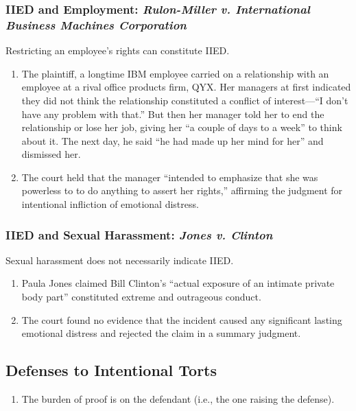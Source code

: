 \subsubsection{IIED and Employment: \emph{Rulon-Miller v. International Business Machines 
    Corporation}}

Restricting an employee's rights can constitute IIED.

\begin{enumerate}
    \item The plaintiff, a longtime IBM employee carried on a relationship 
    with an employee at a rival office products firm, QYX. Her managers at 
    first indicated they did not think the relationship constituted a conflict 
    of interest---``I don't have any problem with that.'' But then her manager 
    told her to end the relationship or lose her job, giving her ``a couple of 
    days to a week'' to think about it. The next day, he said ``he had made up 
    her mind for her'' and dismissed her.
    \item The court held that the manager ``intended to emphasize that she was 
    powerless to to do anything to assert her rights,'' affirming the judgment 
    for intentional infliction of emotional distress.
\end{enumerate}

\subsubsection{IIED and Sexual Harassment: \emph{Jones v. Clinton}}

Sexual harassment does not necessarily indicate IIED.

\begin{enumerate}
    \item Paula Jones claimed Bill Clinton's ``actual exposure of an intimate 
    private body part'' constituted extreme and outrageous conduct.
    \item The court found no evidence that the incident caused any significant 
    lasting emotional distress and rejected the claim in a summary judgment.
\end{enumerate}

\subsection{Defenses to Intentional Torts}

\begin{enumerate}
    \item The burden of proof is on the defendant (i.e., the one raising the 
    defense).
\end{enumerate}

